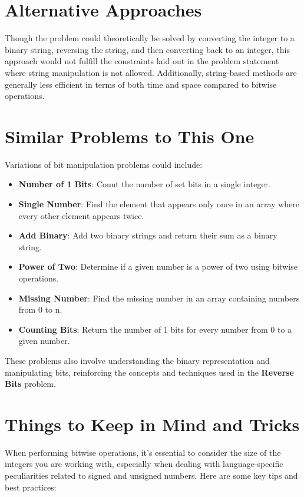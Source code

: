 \section*{Alternative Approaches}

Though the problem could theoretically be solved by converting the integer to a binary string, reversing the string, and then converting back to an integer, this approach would not fulfill the constraints laid out in the problem statement where string manipulation is not allowed. Additionally, string-based methods are generally less efficient in terms of both time and space compared to bitwise operations.

\section*{Similar Problems to This One}

Variations of bit manipulation problems could include:

\begin{itemize}
    \item \textbf{Number of 1 Bits}: Count the number of set bits in a single integer.
    \item \textbf{Single Number}: Find the element that appears only once in an array where every other element appears twice.
    \item \textbf{Add Binary}: Add two binary strings and return their sum as a binary string.
    \item \textbf{Power of Two}: Determine if a given number is a power of two using bitwise operations.
    \item \textbf{Missing Number}: Find the missing number in an array containing numbers from 0 to n.
    \item \textbf{Counting Bits}: Return the number of 1 bits for every number from 0 to a given number.
\end{itemize}

These problems also involve understanding the binary representation and manipulating bits, reinforcing the concepts and techniques used in the \textbf{Reverse Bits} problem.

\section*{Things to Keep in Mind and Tricks}

When performing bitwise operations, it's essential to consider the size of the integers you are working with, especially when dealing with language-specific peculiarities related to signed and unsigned numbers. Here are some key tips and best practices:

